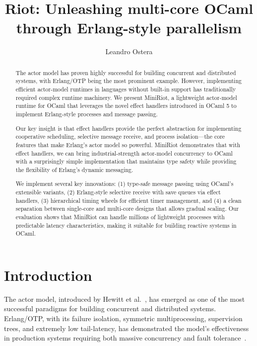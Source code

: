 \documentclass[sigplan,screen]{acmart}
\begin{document}
\title{Riot: Unleashing multi-core OCaml\\through Erlang-style parallelism}

\author{Leandro Ostera}

\begin{abstract}
The actor model has proven highly successful for building concurrent and distributed systems, with Erlang/OTP being the most prominent example. However, implementing efficient actor-model runtimes in languages without built-in support has traditionally required complex runtime machinery. We present MiniRiot, a lightweight actor-model runtime for OCaml that leverages the novel effect handlers introduced in OCaml 5 to implement Erlang-style processes and message passing. 

Our key insight is that effect handlers provide the perfect abstraction for implementing cooperative scheduling, selective message receive, and process isolation—the core features that make Erlang's actor model so powerful. MiniRiot demonstrates that with effect handlers, we can bring industrial-strength actor-model concurrency to OCaml with a surprisingly simple implementation that maintains type safety while providing the flexibility of Erlang's dynamic messaging.

We implement several key innovations: (1) type-safe message passing using OCaml's extensible variants, (2) Erlang-style selective receive with save queues via effect handlers, (3) hierarchical timing wheels for efficient timer management, and (4) a clean separation between single-core and multi-core designs that allows gradual scaling. Our evaluation shows that MiniRiot can handle millions of lightweight processes with predictable latency characteristics, making it suitable for building reactive systems in OCaml.
\end{abstract}

\maketitle

\section{Introduction}

The actor model, introduced by Hewitt et al.~\cite{hewitt1973}, has emerged as one of the most successful paradigms for building concurrent and distributed systems. Erlang/OTP, with its failure isolation, symmetric multiprocessing, supervision trees, and extremely low tail-latency, has demonstrated the model's effectiveness in production systems requiring both massive concurrency and fault tolerance~\cite{armstrong2003making}.
\end{document}
